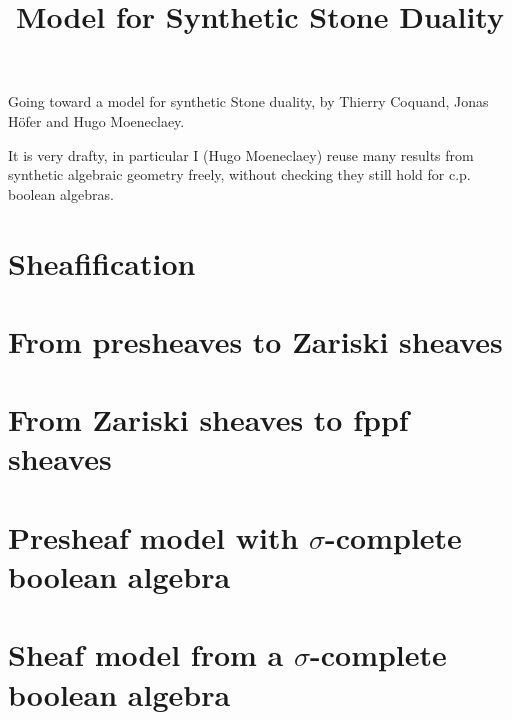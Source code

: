 \documentclass{../util/zariski}
\title{Model for Synthetic Stone Duality}
\begin{document}
\maketitle

Going toward a model for synthetic Stone duality, by Thierry Coquand, Jonas Höfer and Hugo Moeneclaey.

It is very drafty, in particular I (Hugo Moeneclaey) reuse many results from synthetic algebraic geometry freely, without checking they still hold for c.p. boolean algebras.


\tableofcontents

%

\section{Sheafification}


\section{From presheaves to Zariski sheaves}


\section{From Zariski sheaves to fppf sheaves}


\section{Presheaf model with $\sigma$-complete boolean algebra}


\section{Sheaf model from a $\sigma$-complete boolean algebra}




\printindex

\printbibliography
\end{document}

